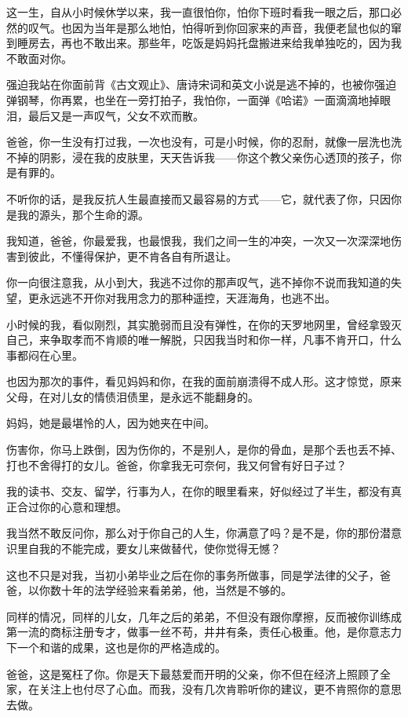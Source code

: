 \par 这一生，自从小时候休学以来，我一直很怕你，怕你下班时看我一眼之后，那口必然的叹气。也因为当年是那么地怕，怕得听到你回家来的声音，我便老鼠也似的窜到睡房去，再也不敢出来。那些年，吃饭是妈妈托盘搬进来给我单独吃的，因为我不敢面对你。
\par 强迫我站在你面前背《古文观止》、唐诗宋词和英文小说是逃不掉的，也被你强迫弹钢琴，你再累，也坐在一旁打拍子，我怕你，一面弹《哈诺》一面滴滴地掉眼泪，最后又是一声叹气，父女不欢而散。
\par 爸爸，你一生没有打过我，一次也没有，可是小时候，你的忍耐，就像一层洗也洗不掉的阴影，浸在我的皮肤里，天天告诉我——你这个教父亲伤心透顶的孩子，你是有罪的。
\par 不听你的话，是我反抗人生最直接而又最容易的方式——它，就代表了你，只因你是我的源头，那个生命的源。
\par 我知道，爸爸，你最爱我，也最恨我，我们之间一生的冲突，一次又一次深深地伤害到彼此，不懂得保护，更不肯各自有所退让。
\par 你一向很注意我，从小到大，我逃不过你的那声叹气，逃不掉你不说而我知道的失望，更永远逃不开你对我用念力的那种遥控，天涯海角，也逃不出。
\par 小时候的我，看似刚烈，其实脆弱而且没有弹性，在你的天罗地网里，曾经拿毁灭自己，来争取孝而不肯顺的唯一解脱，只因我当时和你一样，凡事不肯开口，什么事都闷在心里。
\par 也因为那次的事件，看见妈妈和你，在我的面前崩溃得不成人形。这才惊觉，原来父母，在对儿女的情债泪债里，是永远不能翻身的。
\par 妈妈，她是最堪怜的人，因为她夹在中间。
\par 伤害你，你马上跌倒，因为伤你的，不是别人，是你的骨血，是那个丢也丢不掉、打也不舍得打的女儿。爸爸，你拿我无可奈何，我又何曾有好日子过？
\par 我的读书、交友、留学，行事为人，在你的眼里看来，好似经过了半生，都没有真正合过你的心意和理想。
\par 我当然不敢反问你，那么对于你自己的人生，你满意了吗？是不是，你的那份潜意识里自我的不能完成，要女儿来做替代，使你觉得无憾？
\par 这也不只是对我，当初小弟毕业之后在你的事务所做事，同是学法律的父子，爸爸，以你数十年的法学经验来看弟弟，他，当然是不够的。
\par 同样的情况，同样的儿女，几年之后的弟弟，不但没有跟你摩擦，反而被你训练成第一流的商标注册专才，做事一丝不苟，井井有条，责任心极重。他，是你意志力下一个和谐的成果，这也是你的严格造成的。
\par 爸爸，这是冤枉了你。你是天下最慈爱而开明的父亲，你不但在经济上照顾了全家，在关注上也付尽了心血。而我，没有几次肯聆听你的建议，更不肯照你的意思去做。
